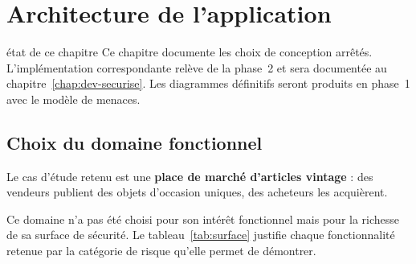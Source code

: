 \chapter{Architecture de l'application}
\label{chap:archi-app}

\begin{constat}{état de ce chapitre}
Ce chapitre documente les choix de conception arrêtés. L'implémentation
correspondante relève de la phase~2 et sera documentée au
chapitre~\ref{chap:dev-securise}. Les diagrammes définitifs seront produits en
phase~1 avec le modèle de menaces.
\end{constat}

\section{Choix du domaine fonctionnel}

Le cas d'étude retenu est une \textbf{place de marché d'articles vintage} :
des vendeurs publient des objets d'occasion uniques, des acheteurs les
acquièrent.

Ce domaine n'a pas été choisi pour son intérêt fonctionnel mais pour la
richesse de sa surface de sécurité. Le tableau~\ref{tab:surface} justifie
chaque fonctionnalité retenue par la catégorie de risque qu'elle permet de
démontrer.

